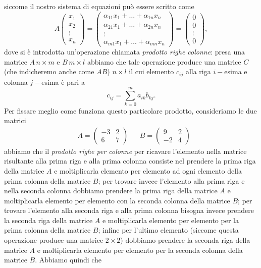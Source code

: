 siccome il nostro sistema di equazioni può essere scritto come
$$
  A \begin{pmatrix}
    x_1 \\
    x_2 \\
    \vdots \\
    x_n
  \end{pmatrix} = \begin{pmatrix} \alpha_{11} x_1 + \ldots + \alpha_{1n} x_n \\ \alpha_{21} x_1 + \ldots + \alpha_{2n} x_n \\ \vdots \\ \alpha_{m1} x_1 + \ldots + \alpha_{mn} x_n \end{pmatrix} = \begin{pmatrix}
    0 \\
    0 \\
    \vdots \\
    0
  \end{pmatrix},
$$
dove si è introdotta un'operazione chiamata \emph{prodotto righe colonne}: presa una matrice $A \, n \times m$ e $B \, m \times l$ abbiamo che tale operazione produce una matrice $C$ (che indicheremo anche come $AB$) $n \times l$ il cui elemento $c_{ij}$ alla riga $i-$esima e colonna $j-$esima è pari a
$$
  c_{ij} = \sum_{k=0}^m a_{ik} b_{kj}.
$$
Per fissare meglio come funziona questo particolare prodotto, consideriamo le due matrici
\begin{align}
  &A = \begin{pmatrix}
    -3 & 2 \\
    6 & 7
  \end{pmatrix} & &B = \begin{pmatrix} 9 & 2 \\ -2 & 4 \end{pmatrix}
\end{align}
abbiamo che il \emph{prodotto righe per colonne} per ricavare l'elemento nella matrice risultante alla prima riga e alla prima colonna consiste nel prendere la prima riga della matrice $A$ e moltiplicarla elemento per elemento ad ogni elemento della prima colonna della matrice $B$; per trovare
invece l'elemento alla prima riga e nella seconda colonna dobbiamo prendere la prima riga della matrice $A$ e moltiplicarla elemento per elemento con la seconda colonna della matrice $B$; per trovare l'elemento alla seconda riga e alla prima colonna bisogna invece prendere la seconda riga della matrice
$A$ e moltiplicarla elemento per elemento per la prima colonna della matrice $B$; infine per l'ultimo elemento (siccome questa operazione produce una matrice $2 \times 2$) dobbiamo prendere la seconda riga della matrice $A$ e moltiplicarla elemento per elemento per la seconda colonna della matrice $B$. Abbiamo quindi che
